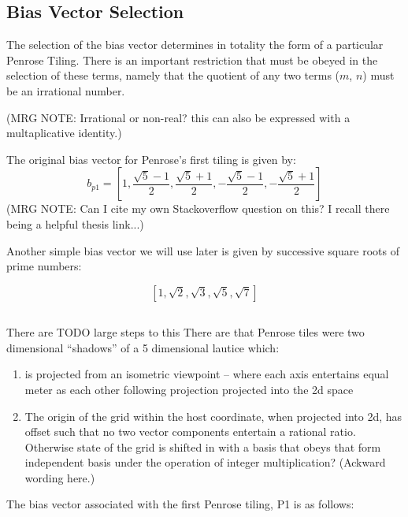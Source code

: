 \documentclass{amsart}
\begin{document}
\subsection{Bias Vector Selection}
The selection of the bias vector determines in totality the form of a particular Penrose Tiling.
There is an important restriction that must be obeyed in the selection of these terms, namely that
the quotient of any two terms ($m$, $n$) must be an irrational number. 

(MRG NOTE: Irrational or non-real? this can also be expressed with a multaplicative identity.)

The original bias vector for Penrose's first tiling is given by:
\begin{equation}
  b_{p1}
  =
  \left[
     1, 
     \frac{\sqrt{5} - 1}{2},
     \frac{\sqrt{5} + 1}{2},
    -\frac{\sqrt{5} - 1}{2},
    -\frac{\sqrt{5} + 1}{2}
  \right]
\end{equation}
(MRG NOTE: Can I cite my own Stackoverflow question on this? I recall there being a helpful thesis link...)

Another simple bias vector we will use later is given by successive square roots of prime numbers:

\begin{equation}
 \left[1, \sqrt{2}, \sqrt{3}, \sqrt{5}, \sqrt{7}\right]
 \label{eq:punt}
\end{equation}



\subsection{}
There are TODO large steps to this 
There are  that Penrose tiles were two dimensional ``shadows'' of
a 5 dimensional lautice which:
\begin{enumerate}
  \item is projected from an isometric viewpoint -- where each axis entertains equal meter 
  as each other following projection projected into the 2d space
  \item The origin of the grid within the host coordinate, when projected into 2d, has offset such that no two vector
  components entertain a rational ratio. Otherwise state  of the grid is shifted in with a basis that obeys that form independent
  basis under the operation of integer multiplication? (Ackward wording here.) 
\end{enumerate}

The bias vector associated with the first Penrose tiling, P1 is as follows:
\end{document}

